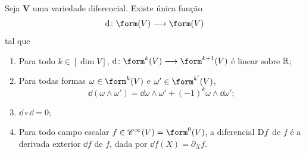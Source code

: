 \begin{prop}
Seja $\bm V$ uma variedade diferencial. Existe única função
	\begin{equation*}
	\dd\colon \form(V) \to \form(V)
	\end{equation*}
tal que
	\begin{enumerate}
	\item Para todo $k \in [\dim V]$, $\dd\colon \form^k(V) \to \form^{k+1}(V)$ é linear sobre $\mathbb{R}$;
	\item  Para todas formas $\omega \in \form^k (V)$ e $\omega' \in \form^{k'} (V)$,
		\begin{equation*}
		\dd(\omega \wedge \omega') = \dd\omega \wedge \omega' + (-1)^k\omega \wedge \dd \omega';
		\end{equation*}
	\item $\dd \circ \dd = 0$;
	\item Para todo campo escalar $f \in \cont^\infty(V) = \form^0(V)$, a diferencial $\mathrm{D} f$ de $f$ é a derivada exterior $\dd f$ de $f$, dada por $\dd f(X) = \partial_X f$.
	\end{enumerate}
\end{prop}




































\cleardoublepage

